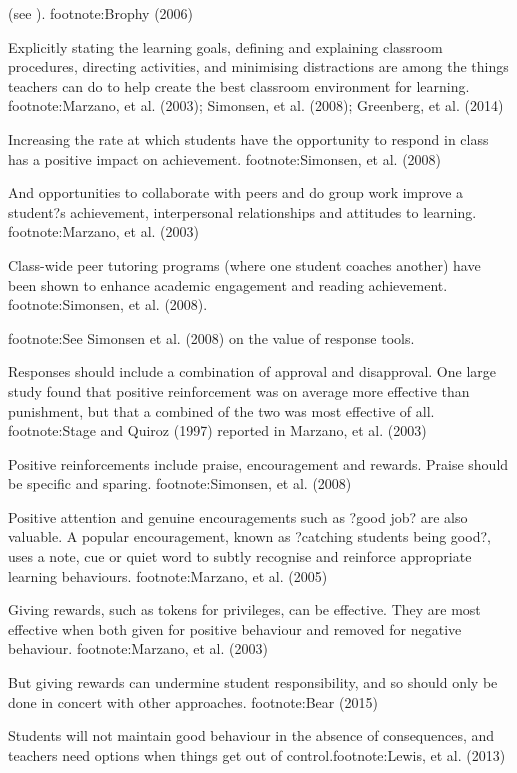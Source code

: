 (see ). footnote:Brophy (2006)

Explicitly stating the learning goals, defining and explaining classroom procedures, directing activities, and minimising distractions are among the things teachers can do to help create the best classroom environment for learning. footnote:Marzano, et al. (2003); Simonsen, et al. (2008); Greenberg, et al. (2014)

Increasing the rate at which students have the opportunity to respond in class has a positive impact on achievement. footnote:Simonsen, et al. (2008) 

And opportunities to collaborate with peers and do group work improve a student?s achievement, interpersonal relationships and attitudes to learning. footnote:Marzano, et al. (2003)

Class-wide peer tutoring programs (where one student coaches another) have been shown to enhance academic engagement and reading achievement. footnote:Simonsen, et al. (2008). 

footnote:See Simonsen et al. (2008) on the value of response tools.

Responses should include a combination of approval and disapproval. One large study found that positive reinforcement was on average more effective than punishment, but that a combined of the two was most effective of all. footnote:Stage and Quiroz (1997) reported in Marzano, et al. (2003)

Positive reinforcements include praise, encouragement and rewards. Praise should be specific and sparing. footnote:Simonsen, et al. (2008)

Positive attention and genuine encouragements such as ?good job? are also valuable. A popular encouragement, known as ?catching students being good?, uses a note, cue or quiet word to subtly recognise and reinforce appropriate learning behaviours. footnote:Marzano, et al. (2005)

Giving rewards, such as tokens for privileges, can be effective. They are most effective when both given for positive behaviour and removed for negative behaviour. footnote:Marzano, et al. (2003)

But giving rewards can undermine student responsibility, and so should only be done in concert with other approaches. footnote:Bear (2015)

 Students will not maintain good behaviour in the absence of consequences, and teachers need options when things get out of control.footnote:Lewis, et al. (2013)   
 
